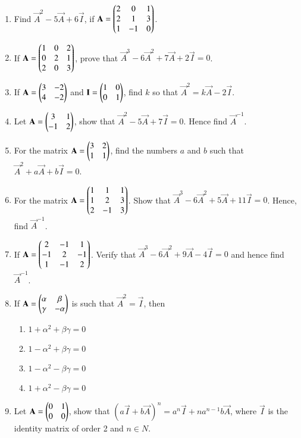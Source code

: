 \begin{enumerate}[label=\thesubsection.\arabic*,ref=\thesubsection.\theenumi]
\item Find $\vec{A}^2-5\vec{A}+6\vec{I}$, if $\mathbf{A}=\begin{pmatrix}
2 & 0 & 1 \\ 2 & 1 & 3 \\ 1 & -1 & 0\end{pmatrix}$.
\item If $\mathbf{A}=\begin{pmatrix}1 & 0 & 2 \\ 0 & 2 & 1 \\ 2 & 0 & 3\end{pmatrix}$, prove that $\vec{A}^3-6\vec{A}^2+7\vec{A}+2\vec{I}=0$.
\item If $\mathbf{A}=\begin{pmatrix}3 & -2 \\ 4 & -2\end{pmatrix}$ and $\mathbf{I}=\begin{pmatrix}1 & 0 \\ 0 & 1\end{pmatrix}$, find $k$ so that $\vec{A}^2=k\vec{A}-2\vec{I}$.
\item Let $\mathbf{A}=\begin{pmatrix}3 & 1 \\ -1 & 2\end{pmatrix}$, show that $\vec{A}^2-5\vec{A}+7\vec{I}=0$. Hence find $\vec{A}^{-1}$.
\item For the matrix $\mathbf{A}=\begin{pmatrix}3 & 2 \\ 1 & 1\end{pmatrix}$, find the numbers $a$ and $b$ such that $\vec{A}^2+a\vec{A}+b\vec{I}=0$.
\item For the matrix $\mathbf{A}=\begin{pmatrix}1 & 1 & 1 \\ 1 & 2 & 3 \\ 2 & -1 & 3\end{pmatrix}$. Show that $\vec{A}^3-6\vec{A}^2+5\vec{A}+11\vec{I}=0$. Hence, find $\vec{A}^{-1}$.
\item If $\mathbf{A}=\begin{pmatrix}2 & -1 & 1 \\ -1 & 2 & -1 \\ 1 & -1 & 2\end{pmatrix}$. Verify that $\vec{A}^3-6\vec{A}^2+9\vec{A}-4\vec{I}=0$ and hence find $\vec{A}^{-1}$.
\item If $\mathbf{A}=\begin{pmatrix}\alpha& \beta \\ \gamma& -\alpha\end{pmatrix}$ is such that $\vec{A}^2= \vec{I}$, then
\begin{enumerate} 
\item $1+ \alpha^2+ \beta \gamma=0$
\item $1-\alpha^2+ \beta \gamma=0$
\item $1-\alpha^2- \beta \gamma=0$
\item $1+\alpha^2- \beta \gamma=0$ 
\end{enumerate}
\item Let $\mathbf{A}=\begin{pmatrix}0 & 1\\ 0 & 0\end{pmatrix}$, show that $(a\vec{I}+b\vec{A})^n= a^n\vec{I}+na^{n-1} b\vec{A}$, where $\vec{I}$ is the identity matrix of order 2 and $n \in N$.

\end{enumerate}
